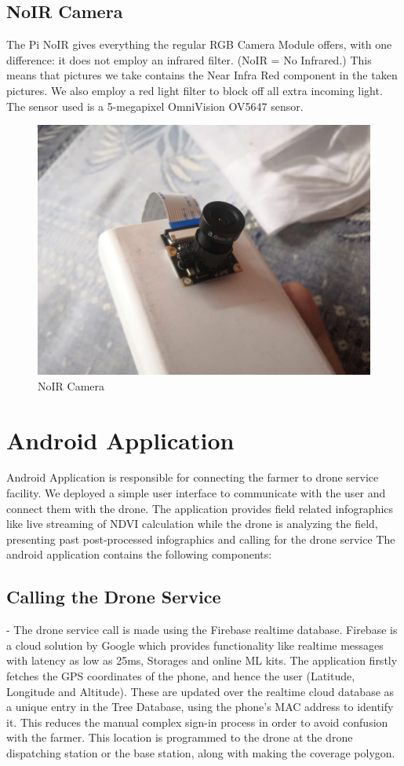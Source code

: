 \subsection{NoIR Camera}
The Pi NoIR gives everything the regular RGB Camera Module offers, with one difference: it does not employ an infrared filter. (NoIR = No Infrared.) This means that pictures we take contains the Near Infra Red component in the taken pictures. We also employ a red light filter to block off all extra incoming light. The sensor used is a 5-megapixel OmniVision OV5647 sensor.
\begin{figure}[H]
    \centering
    \includegraphics[width=0.7\linewidth]{SummerInterReport/project/Images-Major/pi_bottom.jpeg}
    \caption{NoIR Camera}
    \label{fig:compEy}
\end{figure}
\section{Android Application}
Android Application is responsible for connecting the farmer to drone service facility. We deployed a simple user interface to communicate with the user and connect them with the drone. The application provides field related infographics like live streaming of NDVI calculation while the drone is analyzing the field, presenting past post-processed infographics and calling for the drone service
The android application contains the following components:
\subsection{Calling the Drone Service}- The drone service call is made using the Firebase realtime database. Firebase is a cloud solution by Google which provides functionality like realtime messages with latency as low as 25ms, Storages and online ML kits. The application firstly fetches the GPS coordinates of the phone, and hence the user (Latitude, Longitude and Altitude). These are updated over the realtime cloud database as a unique entry in the Tree Database, using the phone's MAC address to identify it. This reduces the manual complex sign-in process in order to avoid confusion with the farmer. This location is programmed to the drone at the drone dispatching station or the base station, along with making the coverage polygon.
